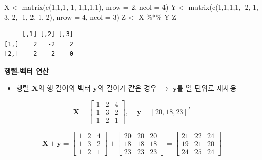 \documentclass[
  11pt,
]{krantz}
\newenvironment{Shaded}{\begin{snugshade}}{\end{snugshade}}
\newcommand{\AttributeTok}[1]{\textcolor[rgb]{0.61,0.61,0.61}{#1}}
\newcommand{\DecValTok}[1]{\textcolor[rgb]{0.06,0.06,0.06}{#1}}
\newcommand{\FunctionTok}[1]{\textcolor[rgb]{0,0,0}{#1}}
\newcommand{\NormalTok}[1]{#1}
\newcommand{\OtherTok}[1]{\textcolor[rgb]{0.37,0.37,0.37}{#1}}
\newcommand{\SpecialCharTok}[1]{\textcolor[rgb]{0,0,0}{#1}}
\providecommand{\tightlist}{%
  \setlength{\itemsep}{0pt}\setlength{\parskip}{0pt}}
\begin{document}
\footnotesize

\begin{Shaded}
\begin{Highlighting}[]
\NormalTok{X }\OtherTok{\textless{}{-}} \FunctionTok{matrix}\NormalTok{(}\FunctionTok{c}\NormalTok{(}\DecValTok{1}\NormalTok{,}\DecValTok{1}\NormalTok{,}\DecValTok{1}\NormalTok{,}\SpecialCharTok{{-}}\DecValTok{1}\NormalTok{,}\SpecialCharTok{{-}}\DecValTok{1}\NormalTok{,}\DecValTok{1}\NormalTok{,}\DecValTok{1}\NormalTok{,}\DecValTok{1}\NormalTok{), }\AttributeTok{nrow =} \DecValTok{2}\NormalTok{, }\AttributeTok{ncol =} \DecValTok{4}\NormalTok{)}
\NormalTok{Y }\OtherTok{\textless{}{-}} \FunctionTok{matrix}\NormalTok{(}\FunctionTok{c}\NormalTok{(}\DecValTok{1}\NormalTok{,}\DecValTok{1}\NormalTok{,}\DecValTok{1}\NormalTok{,}\DecValTok{1}\NormalTok{, }\SpecialCharTok{{-}}\DecValTok{2}\NormalTok{, }\DecValTok{1}\NormalTok{, }\DecValTok{3}\NormalTok{, }\DecValTok{2}\NormalTok{, }\SpecialCharTok{{-}}\DecValTok{1}\NormalTok{, }\DecValTok{2}\NormalTok{, }\DecValTok{1}\NormalTok{, }\DecValTok{2}\NormalTok{), }\AttributeTok{nrow =} \DecValTok{4}\NormalTok{, }\AttributeTok{ncol =} \DecValTok{3}\NormalTok{)}
\NormalTok{Z }\OtherTok{\textless{}{-}}\NormalTok{ X }\SpecialCharTok{\%*\%}\NormalTok{ Y}
\NormalTok{Z}
\end{Highlighting}
\end{Shaded}

\begin{verbatim}
     [,1] [,2] [,3]
[1,]    2   -2    2
[2,]    2    2    0
\end{verbatim}

\normalsize

\textbf{행렬-벡터 연산}

\begin{itemize}
\tightlist
\item
  행렬 \(\mathrm{\mathbf{X}}\)의 행 길이와 벡터 \(\mathrm{\mathbf y}\)의 길이가 같은 경우 \(\rightarrow\) \(\mathrm{\mathbf y}\)를 열 단위로 재사용
\end{itemize}

\[\mathrm{\mathbf{X}} = 
\begin{bmatrix}
1 & 2 & 4\\
1 & 3 & 2\\
1 & 2 & 1
\end{bmatrix}, ~~~~~
\mathrm{\mathbf y} = [20, 18, 23]^T
\]

\[\mathrm{\mathbf{X}} + \mathrm{\mathbf{y}} = 
\begin{bmatrix}
1 & 2 & 4\\
1 & 3 & 2\\
1 & 2 & 1
\end{bmatrix} + 
\begin{bmatrix}
20 & 20 & 20\\
18 & 18 & 18\\
23 & 23 & 23
\end{bmatrix} = 
\begin{bmatrix}
21 & 22 & 24\\
19 & 21 & 20\\
24 & 25 & 24
\end{bmatrix}
\]
\end{document}
